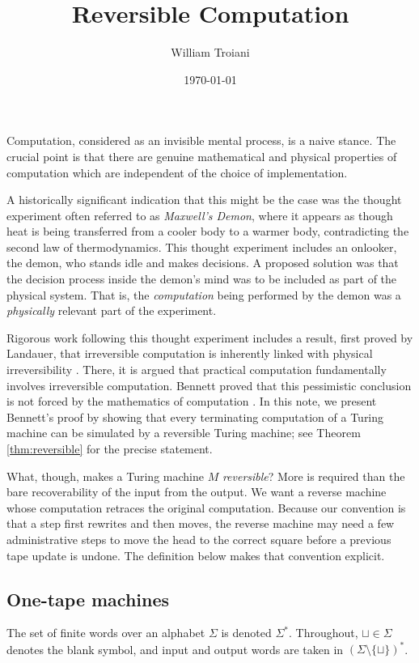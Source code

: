\documentclass[12pt]{article}
\title{Reversible Computation}
\author{William Troiani}
\date{\today}
\theoremstyle{plain}
\theoremstyle{definition}
\newcommand{\blank}{\sqcup}
\begin{document}
\maketitle

Computation, considered as an invisible mental process, is a naive stance. The crucial point is that there are genuine mathematical and physical properties of computation which are independent of the choice of implementation.

A historically significant indication that this might be the case was the thought experiment often referred to as \emph{Maxwell's Demon}, where it appears as though heat is being transferred from a cooler body to a warmer body, contradicting the second law of thermodynamics. This thought experiment includes an onlooker, the demon, who stands idle and makes decisions. A proposed solution was that the decision process inside the demon's mind was to be included as part of the physical system. That is, the \emph{computation} being performed by the demon was a \emph{physically} relevant part of the experiment.

Rigorous work following this thought experiment includes a result, first proved by Landauer, that irreversible computation is inherently linked with physical irreversibility \cite{Landauer}. There, it is argued that practical computation fundamentally involves irreversible computation. Bennett proved that this pessimistic conclusion is not forced by the mathematics of computation \cite{Bennett}. In this note, we present Bennett's proof by showing that every terminating computation of a Turing machine can be simulated by a reversible Turing machine; see Theorem \ref{thm:reversible} for the precise statement.

What, though, makes a Turing machine $M$ \emph{reversible}? More is required than the bare recoverability of the input from the output. We want a reverse machine whose computation retraces the original computation. Because our convention is that a step first rewrites and then moves, the reverse machine may need a few administrative steps to move the head to the correct square before a previous tape update is undone. The definition below makes that convention explicit.

\subsection{One-tape machines}

The set of finite words over an alphabet $\Sigma$ is denoted $\Sigma^\ast$. Throughout, $\blank\in\Sigma$ denotes the blank symbol, and input and output words are taken in $(\Sigma\setminus\{\blank\})^\ast$.
\end{document}
